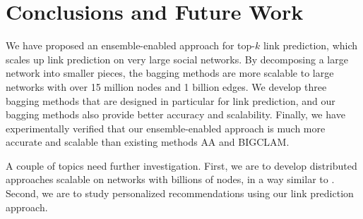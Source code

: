 \documentclass[10pt,journal,compsoc]{IEEEtran}
\newcommand{\Aa}{{\sf AA}\xspace }
\newcommand{\BIGCLAM}{{\sf BIGCLAM}\xspace}
\begin{document}
\IEEEdisplaynontitleabstractindextext



%
\IEEEpeerreviewmaketitle







\section{Conclusions and Future Work}
We have proposed an ensemble-enabled approach for top-$k$ link prediction, which scales up link prediction on very large social
networks. By decomposing a large network into smaller pieces, the bagging methods are more scalable to large networks with over 15 million nodes and 1 billion edges. We develop three bagging methods that are designed in particular for link prediction, and our bagging methods also provide better accuracy and scalability. Finally, we have experimentally verified that our ensemble-enabled approach is much more accurate and scalable than existing methods \Aa \cite{adamic} and \BIGCLAM \cite{yang-wsdm2013}.

A couple of topics need further investigation. First, we are to develop distributed approaches scalable on networks with billions of nodes, in a way similar to \cite{NMF-www2010}.   Second, we are to study personalized recommendations using our link prediction approach.



\end{document}
